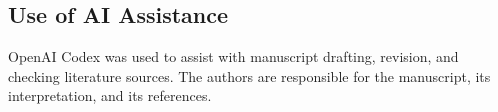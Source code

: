 \subsection{Use of AI Assistance}
OpenAI Codex was used to assist with manuscript drafting, revision, and checking literature sources. The authors are responsible for the manuscript, its interpretation, and its references.
